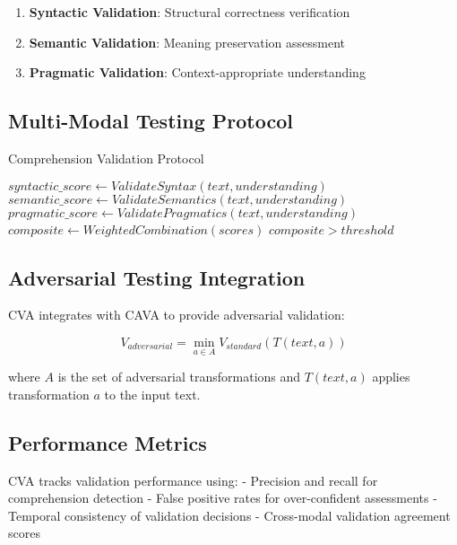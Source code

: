 \documentclass[12pt,a4paper]{article}
\begin{document}
\begin{enumerate}
\item \textbf{Syntactic Validation}: Structural correctness verification
\item \textbf{Semantic Validation}: Meaning preservation assessment  
\item \textbf{Pragmatic Validation}: Context-appropriate understanding
\end{enumerate}

\subsection{Multi-Modal Testing Protocol}

\begin{algorithm}[H]
\caption{Comprehension Validation Protocol}
\begin{algorithmic}[1]
    \State $syntactic\_score \leftarrow ValidateSyntax(text, understanding)$
    \State $semantic\_score \leftarrow ValidateSemantics(text, understanding)$
    \State $pragmatic\_score \leftarrow ValidatePragmatics(text, understanding)$
    \State $composite \leftarrow WeightedCombination(scores)$
    \State \Return $composite > threshold$
\EndFunction
\end{algorithmic}
\end{algorithm}

\subsection{Adversarial Testing Integration}

CVA integrates with CAVA to provide adversarial validation:

\begin{equation}
V_{adversarial} = \min_{a \in A} V_{standard}(T(text, a))
\end{equation}

where $A$ is the set of adversarial transformations and $T(text, a)$ applies transformation $a$ to the input text.

\subsection{Performance Metrics}

CVA tracks validation performance using:
- Precision and recall for comprehension detection
- False positive rates for over-confident assessments  
- Temporal consistency of validation decisions
- Cross-modal validation agreement scores
\end{document}
